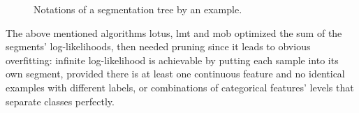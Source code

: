 \begin{figure}
\caption{Notations of a segmentation tree by an example.}
\label{fig_arbre_ex_notations}
\end{figure}

The above mentioned algorithms \gls{lotus}, \gls{lmt} and \gls{mob} optimized the sum of the segments' log-likelihoods, then needed pruning since it leads to obvious overfitting: infinite log-likelihood is achievable by putting each sample into its own segment, provided there is at least one continuous feature and no identical examples with different labels, or combinations of categorical features' levels that separate classes perfectly.


